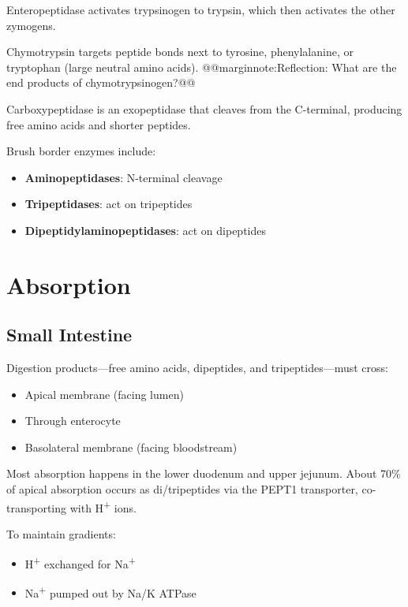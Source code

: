 \documentclass{tufte-handout}
\makeatletter
\def\marginnote#1{@@marginnote:#1@@}
\makeatother
\begin{document}
Enteropeptidase activates trypsinogen to trypsin, which then activates the other zymogens.

Chymotrypsin targets peptide bonds next to tyrosine, phenylalanine, or tryptophan (large neutral amino acids).
\marginnote{Reflection: What are the end products of chymotrypsinogen?}

Carboxypeptidase is an exopeptidase that cleaves from the C-terminal, producing free amino acids and shorter peptides.

Brush border enzymes include:
\begin{itemize}
  \item \textbf{Aminopeptidases}: N-terminal cleavage
  \item \textbf{Tripeptidases}: act on tripeptides
  \item \textbf{Dipeptidylaminopeptidases}: act on dipeptides
\end{itemize}

\section{Absorption}

\subsection{Small Intestine}
Digestion products—free amino acids, dipeptides, and tripeptides—must cross:
\begin{itemize}
  \item Apical membrane (facing lumen)
  \item Through enterocyte
  \item Basolateral membrane (facing bloodstream)
\end{itemize}

Most absorption happens in the lower duodenum and upper jejunum. About 70\% of apical absorption occurs as di/tripeptides via the PEPT1 transporter, co-transporting with H\textsuperscript{+} ions.

To maintain gradients:
\begin{itemize}
  \item H\textsuperscript{+} exchanged for Na\textsuperscript{+}
  \item Na\textsuperscript{+} pumped out by Na/K ATPase
\end{itemize}
\end{document}
